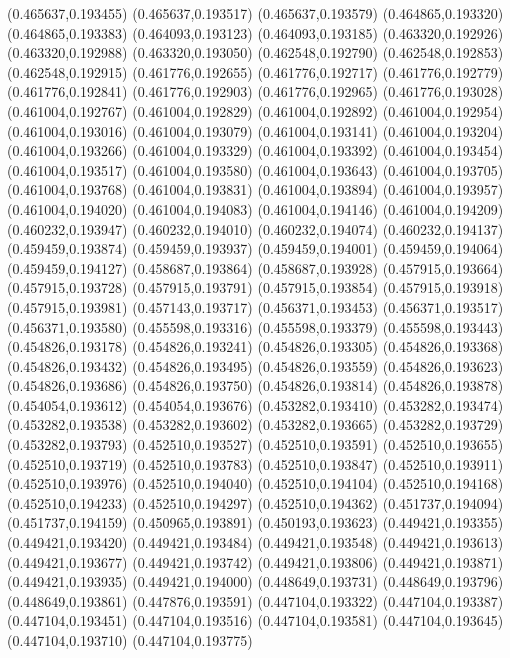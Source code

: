 (0.465637,0.193455)
(0.465637,0.193517)
(0.465637,0.193579)
(0.464865,0.193320)
(0.464865,0.193383)
(0.464093,0.193123)
(0.464093,0.193185)
(0.463320,0.192926)
(0.463320,0.192988)
(0.463320,0.193050)
(0.462548,0.192790)
(0.462548,0.192853)
(0.462548,0.192915)
(0.461776,0.192655)
(0.461776,0.192717)
(0.461776,0.192779)
(0.461776,0.192841)
(0.461776,0.192903)
(0.461776,0.192965)
(0.461776,0.193028)
(0.461004,0.192767)
(0.461004,0.192829)
(0.461004,0.192892)
(0.461004,0.192954)
(0.461004,0.193016)
(0.461004,0.193079)
(0.461004,0.193141)
(0.461004,0.193204)
(0.461004,0.193266)
(0.461004,0.193329)
(0.461004,0.193392)
(0.461004,0.193454)
(0.461004,0.193517)
(0.461004,0.193580)
(0.461004,0.193643)
(0.461004,0.193705)
(0.461004,0.193768)
(0.461004,0.193831)
(0.461004,0.193894)
(0.461004,0.193957)
(0.461004,0.194020)
(0.461004,0.194083)
(0.461004,0.194146)
(0.461004,0.194209)
(0.460232,0.193947)
(0.460232,0.194010)
(0.460232,0.194074)
(0.460232,0.194137)
(0.459459,0.193874)
(0.459459,0.193937)
(0.459459,0.194001)
(0.459459,0.194064)
(0.459459,0.194127)
(0.458687,0.193864)
(0.458687,0.193928)
(0.457915,0.193664)
(0.457915,0.193728)
(0.457915,0.193791)
(0.457915,0.193854)
(0.457915,0.193918)
(0.457915,0.193981)
(0.457143,0.193717)
(0.456371,0.193453)
(0.456371,0.193517)
(0.456371,0.193580)
(0.455598,0.193316)
(0.455598,0.193379)
(0.455598,0.193443)
(0.454826,0.193178)
(0.454826,0.193241)
(0.454826,0.193305)
(0.454826,0.193368)
(0.454826,0.193432)
(0.454826,0.193495)
(0.454826,0.193559)
(0.454826,0.193623)
(0.454826,0.193686)
(0.454826,0.193750)
(0.454826,0.193814)
(0.454826,0.193878)
(0.454054,0.193612)
(0.454054,0.193676)
(0.453282,0.193410)
(0.453282,0.193474)
(0.453282,0.193538)
(0.453282,0.193602)
(0.453282,0.193665)
(0.453282,0.193729)
(0.453282,0.193793)
(0.452510,0.193527)
(0.452510,0.193591)
(0.452510,0.193655)
(0.452510,0.193719)
(0.452510,0.193783)
(0.452510,0.193847)
(0.452510,0.193911)
(0.452510,0.193976)
(0.452510,0.194040)
(0.452510,0.194104)
(0.452510,0.194168)
(0.452510,0.194233)
(0.452510,0.194297)
(0.452510,0.194362)
(0.451737,0.194094)
(0.451737,0.194159)
(0.450965,0.193891)
(0.450193,0.193623)
(0.449421,0.193355)
(0.449421,0.193420)
(0.449421,0.193484)
(0.449421,0.193548)
(0.449421,0.193613)
(0.449421,0.193677)
(0.449421,0.193742)
(0.449421,0.193806)
(0.449421,0.193871)
(0.449421,0.193935)
(0.449421,0.194000)
(0.448649,0.193731)
(0.448649,0.193796)
(0.448649,0.193861)
(0.447876,0.193591)
(0.447104,0.193322)
(0.447104,0.193387)
(0.447104,0.193451)
(0.447104,0.193516)
(0.447104,0.193581)
(0.447104,0.193645)
(0.447104,0.193710)
(0.447104,0.193775)
